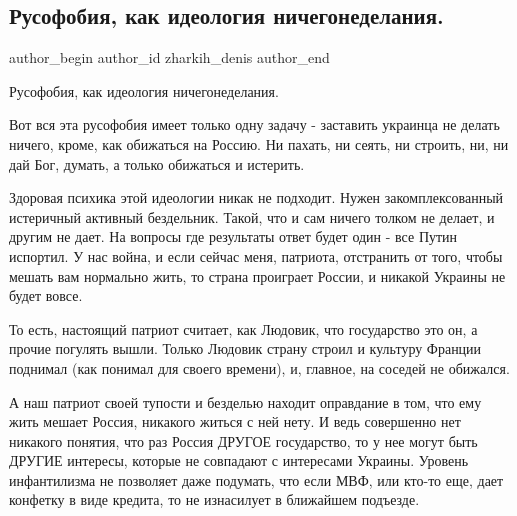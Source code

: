  
 
 
 
 
 
\subsection{Русофобия, как идеология ничегонеделания.}
\label{sec:12_08_2021.fb.zharkih_denis.1.russofobia}
 
\ifcmt
 author_begin
   author_id zharkih_denis
 author_end
\fi

Русофобия, как идеология ничегонеделания. 

Вот вся эта русофобия имеет только одну задачу - заставить украинца не делать
ничего, кроме, как обижаться на Россию. Ни пахать, ни сеять, ни строить, ни, ни
дай Бог, думать, а только обижаться и истерить. 

Здоровая психика этой идеологии никак не подходит. Нужен закомплексованный
истеричный активный бездельник. Такой, что и сам ничего толком не делает, и
другим не дает. На вопросы где результаты ответ будет один - все Путин
испортил. У нас война, и если сейчас меня, патриота, отстранить от того, чтобы
мешать вам нормально жить, то страна проиграет России, и никакой Украины не
будет вовсе. 

То есть, настоящий патриот считает, как Людовик, что государство это он, а
прочие погулять вышли. Только Людовик страну строил и культуру Франции поднимал
(как понимал для своего времени), и, главное, на соседей не обижался. 

А наш патриот своей тупости и безделью находит оправдание в том, что ему жить
мешает Россия, никакого житься с ней нету. И ведь совершенно нет никакого
понятия, что раз Россия ДРУГОЕ государство, то у нее могут быть ДРУГИЕ
интересы, которые не совпадают с интересами Украины. Уровень инфантилизма не
позволяет даже подумать, что если МВФ, или кто-то еще, дает конфетку в виде
кредита, то не изнасилует в ближайшем подъезде. 

